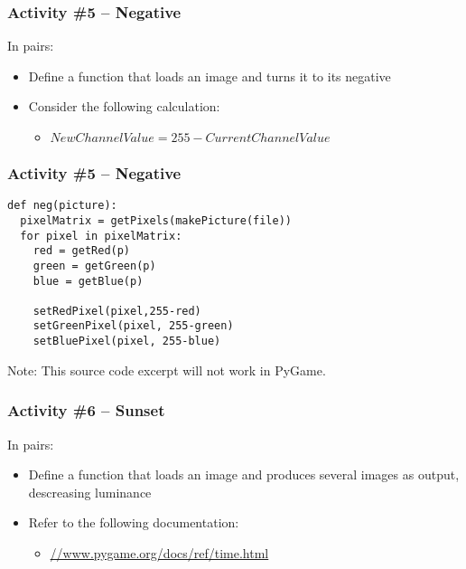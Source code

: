 \begin{frame}
	\frametitle{Activity \#5 -- Negative}
	
	In pairs:
	
	\vspace{2em}
	
	\begin{itemize}
		\item Define a function that loads an image and turns it to its negative
		\item Consider the following calculation:
		\begin{itemize}
			\item $New Channel Value = 255 - Current Channel Value$
		\end{itemize}
	\end{itemize}
\end{frame}

\begin{frame}[fragile]
	\frametitle{Activity \#5 -- Negative}
	
\begin{lstlisting}
def neg(picture):
  pixelMatrix = getPixels(makePicture(file))
  for pixel in pixelMatrix:
    red = getRed(p)
    green = getGreen(p)
    blue = getBlue(p)
        
    setRedPixel(pixel,255-red)
    setGreenPixel(pixel, 255-green)
    setBluePixel(pixel, 255-blue)
\end{lstlisting}

Note: This source code excerpt will not work in PyGame.

\end{frame}

\begin{frame}
	\frametitle{Activity \#6 -- Sunset}
	
	In pairs:
	
	\vspace{2em}
	
	\begin{itemize}
		\item Define a function that loads an image and produces several images as output, descreasing luminance
		\item Refer to the following documentation:
		\begin{itemize}
			\item \url{//www.pygame.org/docs/ref/time.html}
		\end{itemize}
	\end{itemize}
\end{frame}

